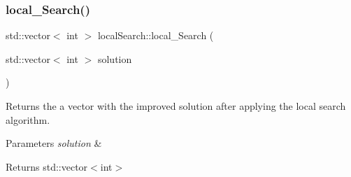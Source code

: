 \subsubsection{\texorpdfstring{local\+\_\+\+Search()}{local\_Search()}}
{\footnotesize\ttfamily std\+::vector$<$ int $>$ local\+Search\+::local\+\_\+\+Search (\begin{DoxyParamCaption}\item[{std\+::vector$<$ int $>$}]{solution }\end{DoxyParamCaption})}



Returns the a vector with the improved solution after applying the local search algorithm. 


\begin{DoxyParams}{Parameters}
{\em solution} & \\
\hline
\end{DoxyParams}
\begin{DoxyReturn}{Returns}
std\+::vector$<$int$>$ 
\end{DoxyReturn}

